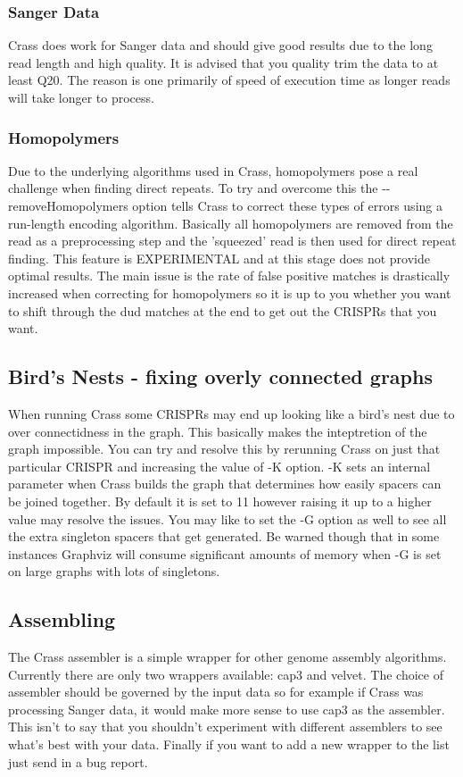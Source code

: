 \documentclass[11pt]{article} %
\begin{document}
\subsubsection{Sanger Data}
Crass does work for Sanger data and should give good results due to the long read length and high quality.  It is advised that you quality trim the data to at least Q20.  The reason is one primarily of speed of execution time as longer reads will take longer to process.
\subsubsection{Homopolymers}
Due to the underlying algorithms used in Crass, homopolymers pose a real challenge when finding direct repeats.  To try and overcome this the -{}-removeHomopolymers option tells Crass to correct these types of errors using a run-length encoding algorithm.  Basically all homopolymers are removed from the read as a preprocessing step and the 'squeezed' read is then used for direct repeat finding.  This feature is EXPERIMENTAL and at this stage does not provide optimal results.  The main issue is the rate of false positive matches is drastically increased when correcting for homopolymers so it is up to you whether you want to shift through the dud matches at the end to get out the CRISPRs that you want.  
\subsection{Bird's Nests - fixing overly connected graphs}
When running Crass some CRISPRs may end up looking like a bird's nest due to over connectidness in the graph.  This basically makes the inteptretion of the graph impossible.  You can try and resolve this by rerunning Crass on just that particular CRISPR and increasing the value of -K option.  -K sets an internal parameter when Crass builds the graph that determines how easily spacers can be joined together.  By default it is set to 11 however raising it up to a higher value may resolve the issues.  You may like to set the -G option as well to see all the extra singleton spacers that get generated.  Be warned though that in some instances Graphviz will consume significant amounts of memory when -G is set on large graphs with lots of singletons.
\subsection{Assembling}
The Crass assembler is a simple wrapper for other genome assembly algorithms.  Currently there are only two wrappers available: cap3 and velvet.  The choice of assembler should be governed by the input data so for example if Crass was processing Sanger data, it would make more sense to use cap3 as the assembler.  This isn't to say that you shouldn't experiment with different assemblers to see what's best with your data.  Finally if you want to add a new wrapper to the list just send in a bug report.
\end{document}
